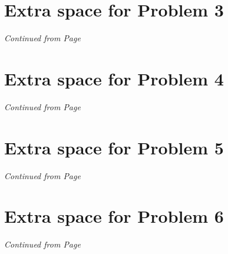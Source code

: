 \documentclass[11pt]{article}
\begin{document}

\label{pg:p2-continuation}
\newpage


\section*{Extra space for Problem 3}
\emph{Continued from Page \pageref{pg:end-of-p3}}\\


\label{pg:p3-continuation}
\newpage



\section*{Extra space for Problem 4}
\emph{Continued from Page \pageref{pg:end-of-p4}}\\


\label{pg:p4-continuation}
\newpage



\section*{Extra space for Problem 5}
\emph{Continued from Page \pageref{pg:end-of-p5}}\\



\label{pg:p5-continuation}
\newpage


\section*{Extra space for Problem 6}
\emph{Continued from Page \pageref{pg:end-of-p6}}\\




\label{pg:p6-continuation}
\newpage
\end{document}
